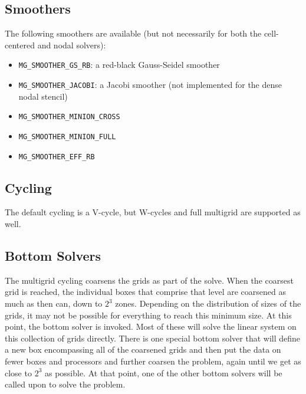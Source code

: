 \subsection{Smoothers}

The following smoothers are available (but not necessarily for both the
cell-centered and nodal solvers):
\begin{itemize}
\item {\tt MG\_SMOOTHER\_GS\_RB}: a red-black Gauss-Seidel smoother

\item {\tt MG\_SMOOTHER\_JACOBI}: a Jacobi smoother (not implemented for 
the dense nodal stencil)

\item {\tt MG\_SMOOTHER\_MINION\_CROSS}

\item {\tt MG\_SMOOTHER\_MINION\_FULL}

\item {\tt MG\_SMOOTHER\_EFF\_RB}
\end{itemize}



\subsection{Cycling}

The default cycling is a V-cycle, but W-cycles and full multigrid are
supported as well.


\subsection{Bottom Solvers}

The multigrid cycling coarsens the grids as part of the solve.  When 
the coarsest grid is reached, the individual boxes that comprise that
level are coarsened as much as then can, down to $2^3$ zones.  Depending
on the distribution of sizes of the grids, it may not be possible for
everything to reach this minimum size.  At this point, the bottom
solver is invoked.  Most of these will solve the linear system
on this collection of grids directly.  There is one special bottom
solver that will define a new box encompassing all of the coarsened
grids and then put the data on fewer boxes and processors and further
coarsen the problem, again until we get as close to $2^3$ as possible.
At that point, one of the other bottom solvers will be called upon
to solve the problem.

